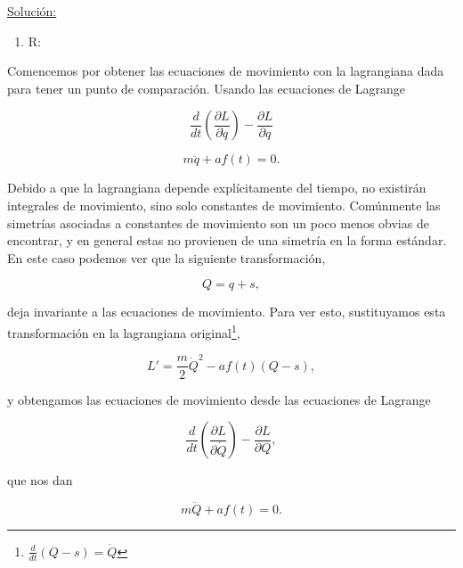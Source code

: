 \documentclass[a4paper,10pt]{article}
\numberwithin{equation}{section}
\begin{document}
\vspace{.3cm}

\underline{Solución:} \vspace{.3cm}

\begin{enumerate}[label=\alph*)]
 \item R:
\end{enumerate}

Comencemos por obtener las ecuaciones de movimiento con la lagrangiana dada para 
tener un punto de comparación. Usando las ecuaciones de Lagrange 

\begin{equation}
 \frac{d}{dt}\left(\frac{\partial L}{\partial \dot{q}}\right) 
 - \frac{\partial L}{\partial q}
\end{equation}

\begin{equation}
 m\ddot{q} + af(t) = 0.
\end{equation}

Debido a que la lagrangiana depende explícitamente del tiempo, no existirán integrales 
de movimiento, sino solo constantes de movimiento. Comúnmente las simetrías asociadas 
a constantes de movimiento son un poco menos obvias de encontrar, y en general estas 
no provienen de una simetría en la forma estándar. En este caso podemos ver que 
la siguiente transformación, 

\begin{equation}
 Q = q + s,
\end{equation}

deja invariante a las ecuaciones de movimiento. Para ver esto, sustituyamos esta 
transformación en la lagrangiana original\footnote{$\frac{d}{dt}(Q -s) = \dot{Q}$},

\begin{equation}
 L' = \frac{m}{2}\dot{Q}^2 - af(t)(Q-s),
\end{equation}

y obtengamos las ecuaciones de movimiento desde las ecuaciones de Lagrange

\begin{equation}
 \frac{d}{dt}\left(\frac{\partial L}{\partial \dot{Q}}\right) 
 - \frac{\partial L}{\partial Q},
\end{equation}

que nos dan

\begin{equation}
 m\ddot{Q} + af(t) = 0.
\end{equation}
\end{document}
